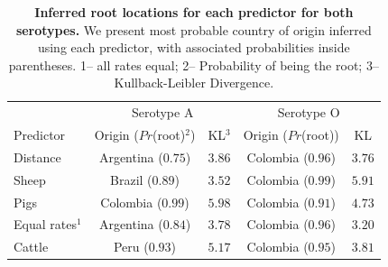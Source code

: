 \documentclass[10pt]{article}
\begin{document}
\begin{table}[H]
\caption{
\textbf{Inferred root locations for each predictor for both serotypes.} We present most probable country of origin inferred using each predictor, with associated probabilities inside parentheses. 1-- all rates equal; 2-- Probability of being the root; 3-- Kullback-Leibler Divergence.
}
\begin{center}
\begin{tabular}{lcccc}
\toprule
& \multicolumn{2}{c}{Serotype A}&\multicolumn{2}{c}{Serotype O}\\
Predictor& Origin ($Pr$(root)$^2$)& KL$^3$&Origin ($Pr$(root))& KL\\
\midrule
Distance & Argentina ($0.75$)& $3.86$ & Colombia ($0.96$)& $3.76$\\
Sheep    & Brazil ($0.89$) & $3.52$ & Colombia ($0.99$)& $5.91$\\
Pigs      & Colombia ($0.99$)& $5.98$& Colombia ($0.91$)& $4.73$\\
Equal rates$^1$  & Argentina ($0.84$)& $3.78$ &Colombia  ($0.96$)& $3.20$\\
Cattle   & Peru ($0.93$)& $5.17$ & Colombia ($0.95$)& $3.81$\\
 \bottomrule
\end{tabular}
\end{center}
\begin{flushleft}
\end{flushleft}
\label{tab:roots}
 \end{table}
\end{document}
